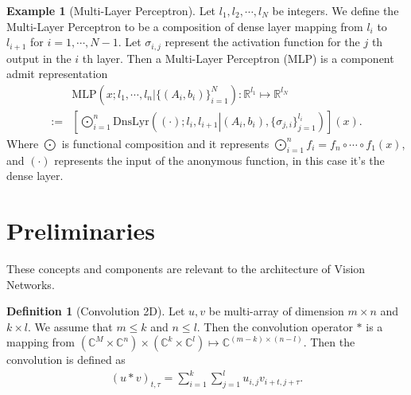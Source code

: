 \documentclass[]{article}
\theoremstyle{definition}
\newtheorem{definition}{Definition}
\newtheorem{example}{Example}[subsection]
\numberwithin{equation}{subsection}
\begin{document}
    \begin{example}[Multi-Layer Perceptron]
        Let $l_1, l_2, \cdots, l_N$ be integers. 
        We define the Multi-Layer Perceptron to be a composition of dense layer mapping from $l_{i}$ to $l_{i + 1}$ for $i = 1, \cdots, N - 1$. 
        Let $\sigma_{i, j}$ represent the activation function for the $j$ th output in the $i$ th layer. 
        Then a Multi-Layer Perceptron (MLP) is a component admit representation
        $$
        \begin{aligned}
            & \text{MLP}\left(x ; l_1, \cdots, l_n | \{(A_i, b_i)\}_{i=1}^N\right): \mathbb R^{l_1} \mapsto \mathbb R^{l_N}
            \\
            :=&
            \left[
            \bigodot_{i = 1}^n \text{DnsLyr}
            \left(
                (\cdot) ; l_i, l_{i + 1} \left| (A_i, b_i), \{\sigma_{j, i}\}_{j=1}^{l_i} \right.
            \right)
            \right](x). 
        \end{aligned}
        $$
        Where $\bigodot$ is functional composition and it represents $\bigodot_{i=1}^n f_i = f_n\circ\cdots\circ f_1(x)$, and $(\cdot)$ represents the input of the anonymous function, in this case it's the dense layer. 
    \end{example}

\section{Preliminaries}
    These concepts and components are relevant to the architecture of Vision Networks. 
    \begin{definition}[Convolution 2D]
        Let $u, v$ be multi-array of dimension $m \times n$ and $k \times l$. 
        We assume that $m \le  k$ and $n \le l$.
        Then the convolution operator $*$ is a mapping from $(\mathbb C^M \times \mathbb C^n)\times (\mathbb C^k \times \mathbb C^l) \mapsto \mathbb C^{(m - k)\times (n - l)}$. 
        Then the convolution is defined as 
        $$
        \begin{aligned}
            (u* v)_{t, \tau} = 
            \sum_{i = 1}^{k}\sum_{j = 1}^{l}u_{i, j}v_{i + t, j + \tau}. 
        \end{aligned}
        $$
    \end{definition}
\end{document}
